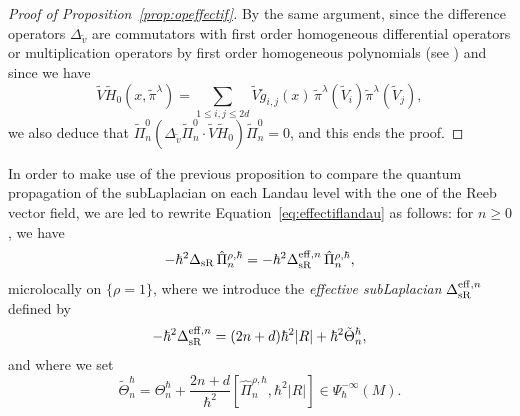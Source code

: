 \documentclass[12pt,a4paper]{amsart}
\theoremstyle{plain}
\theoremstyle{definition}
\theoremstyle{remark}
\numberwithin{equation}{section}
\theoremstyle{definition}
\numberwithin{equation}{section}
\begin{document}
\begin{proof}[Proof of Proposition~\ref{prop:opeffectif}]
    By the same argument, since the difference operators $\Delta_{\tilde{v}}$ are commutators with first order homogeneous differential operators or multiplication operators by first order homogeneous polynomials (see \cite[Section 6.3.3]{FR}) and since we have
    \begin{equation*}
        \tilde{V}\tilde{H}_0(x,\tilde{\pi}^\lambda) = \sum_{1\leq i,j\leq 2d} \tilde{V}\tilde{g}_{i,j}(x)\,\tilde{\pi}^\lambda(\tilde{V}_i)\tilde{\pi}^\lambda(\tilde{V}_j), 
    \end{equation*}
    we also deduce that $\tilde{\Pi}_n^0\left(\Delta_{\tilde{v}} \tilde{\Pi}_n^0\cdot \tilde{V}\tilde{H}_0\right) \tilde{\Pi}_n^0 = 0$, and this ends the proof.
\end{proof}

In order to make use of the previous proposition to compare the quantum propagation of the subLaplacian on each Landau level with the one of the Reeb vector field, we are led to rewrite Equation~\eqref{eq:effectiflandau} as follows: for $n\geq 0$, we have
\begin{equation}
    \label{eq:effectivesubLapequality}
    -\hbar^2 \Delta_{\rm sR}\,\hat{\Pi}_n^{\rho,\hbar} = -\hbar^2\Delta_{\rm sR}^{{\rm eff},n}\,\hat{\Pi}_n^{\rho,\hbar},
\end{equation}
microlocally on $\{\rho = 1\}$, where we introduce the \emph{effective subLaplacian} $\Delta_{\rm sR}^{{\rm eff},n}$ defined by
\begin{equation*}
    -\hbar^2\Delta_{\rm sR}^{{\rm eff},n} = (2n+d)\hbar^2|R| + \hbar^2\tilde{\Theta}_n^\hbar,
\end{equation*}
and where we set
\begin{equation*}
    \tilde{\Theta}_n^\hbar = \Theta_n^\hbar + \frac{2n+d}{\hbar^2}\left[\hat{\Pi}_n^{\rho,\hbar},\hbar^2 |R|\right]\in \Psi_\hbar^{-\infty}(M).
\end{equation*}
\end{document}
